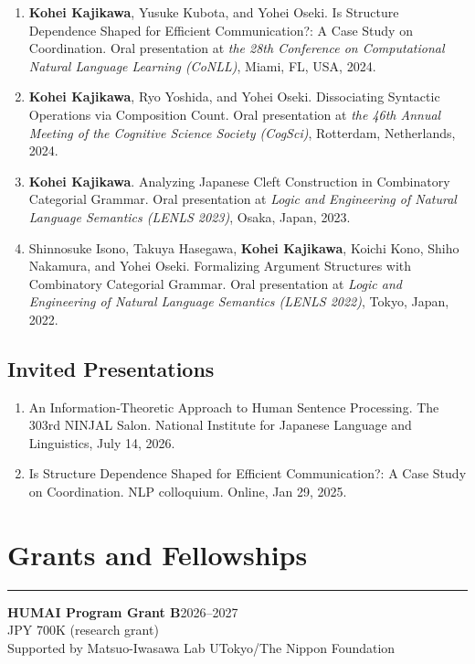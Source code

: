 \documentclass[10pt,a4paper]{article}
\newcommand{\entrygap}{\vspace{6pt}}
\newcommand{\rulegap}{\vspace{6pt}}
\begin{document}
\begin{enumerate}
    \item \textbf{Kohei Kajikawa}, Yusuke Kubota, and Yohei Oseki. Is Structure Dependence Shaped for Efficient Communication?: A Case Study on Coordination. Oral presentation at \textit{the 28th Conference on Computational Natural Language Learning (CoNLL)}, Miami, FL, USA, 2024.
    \item \textbf{Kohei Kajikawa}, Ryo Yoshida, and Yohei Oseki. Dissociating Syntactic Operations via Composition Count. Oral presentation at \textit{the 46th Annual Meeting of the Cognitive Science Society (CogSci)}, Rotterdam, Netherlands, 2024.
    \item \textbf{Kohei Kajikawa}. Analyzing Japanese Cleft Construction in Combinatory Categorial Grammar. Oral presentation at \textit{Logic and Engineering of Natural Language Semantics (LENLS 2023)}, Osaka, Japan, 2023.
    \item Shinnosuke Isono, Takuya Hasegawa, \textbf{Kohei Kajikawa}, Koichi Kono, Shiho Nakamura, and Yohei Oseki. Formalizing Argument Structures with Combinatory Categorial Grammar. Oral presentation at \textit{Logic and Engineering of Natural Language Semantics (LENLS 2022)}, Tokyo, Japan, 2022.
\end{enumerate}


\subsection*{Invited Presentations}
\begin{enumerate}
    \item An Information-Theoretic Approach to Human Sentence Processing. The 303rd NINJAL Salon. National Institute for Japanese Language and Linguistics, July 14, 2026.
    \item Is Structure Dependence Shaped for Efficient Communication?: A Case Study on Coordination. NLP colloquium. Online, Jan 29, 2025.
\end{enumerate}

\section*{Grants and Fellowships}
\hrule
\rulegap

\textbf{HUMAI Program Grant B}\hfill{2026--2027} \\
JPY 700K (research grant) \\
Supported by Matsuo-Iwasawa Lab UTokyo/The Nippon Foundation

\entrygap
\end{document}
